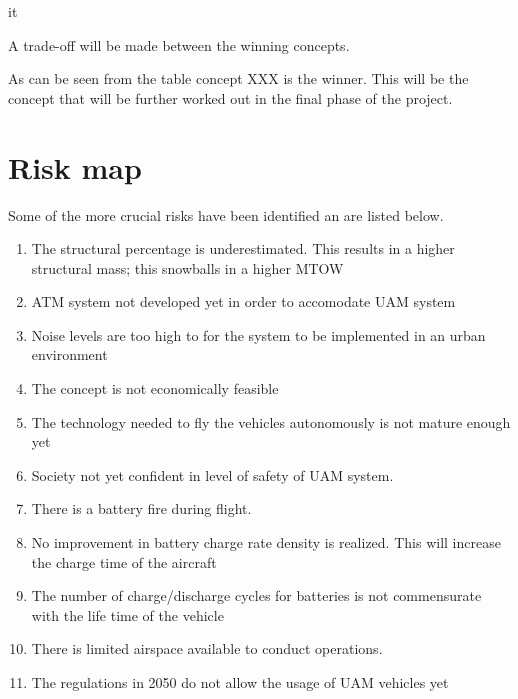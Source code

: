  it 

A trade-off will be made between the winning concepts. 








As can be seen from the table concept XXX is the winner. This will be the concept that will be further worked out in the final phase of the project. 


\section{Risk map}
Some of the more crucial risks have been identified an are listed below. 

\begin{enumerate}
    \item The structural percentage is underestimated. This results in a higher structural mass; this snowballs in a higher MTOW
    \item ATM system not developed yet in order to accomodate UAM system
    \item Noise levels are too high to for the system to be implemented in an urban environment 
    \item The concept is not economically feasible 
    \item The technology needed to fly the vehicles autonomously is not mature enough yet
    \item Society not yet confident in level of safety of UAM system.
    \item There is a battery fire during flight.
    \item No improvement in battery charge rate density is realized. This will increase the charge time of the aircraft
    \item The number of charge/discharge cycles for batteries is not commensurate with the life time of the vehicle
    \item There is limited airspace available to conduct operations. 
    \item The regulations in 2050 do not allow the usage of UAM vehicles yet 
\end{enumerate}

